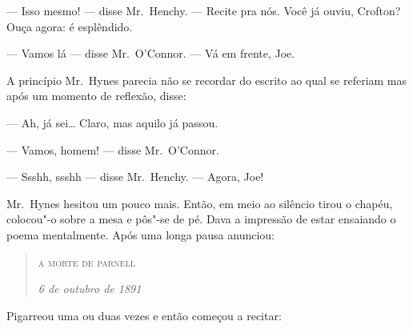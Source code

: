 --- Isso mesmo! --- disse Mr.~Henchy.  --- Recite pra nós.  Você já ouviu,
Crofton? Ouça agora: é esplêndido.

--- Vamos lá --- disse Mr.~O’Connor.  --- Vá em frente, Joe.

A princípio Mr.~Hynes parecia não se recordar do escrito ao qual se referiam
mas após um momento de reflexão, disse:

--- Ah, já sei\ldots{} Claro, mas aquilo já passou.

--- Vamos, homem! --- disse Mr.~O’Connor.

--- Ssshh, ssshh --- disse Mr.~Henchy.  --- Agora, Joe!

Mr.~Hynes hesitou um pouco mais.  Então, em meio ao silêncio tirou o chapéu,
colocou"-o sobre a mesa e pôs"-se de pé.  Dava a impressão de estar ensaiando o
poema mentalmente.  Após uma longa pausa anunciou:

\begin{quote}\centering
\textsc{a morte de parnell}

\textit{6 de outubro de 1891}
\end{quote}

Pigarreou uma ou duas vezes e então começou a recitar:

